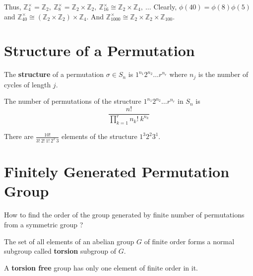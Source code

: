 \begin{enumerate}
		Thus, $\mathbb{Z}_4^\times = \mathbb{Z}_2,\ \mathbb{Z}_8^\times = \mathbb{Z}_2 \times \mathbb{Z}_2,\ \mathbb{Z}_{16}^\times \cong \mathbb{Z}_2 \times \mathbb{Z}_4,\ \dots$
		Clearly, $\phi(40) = \phi(8)\phi(5)$ and $\mathbb{Z}_{40}^\times \cong (\mathbb{Z}_2 \times \mathbb{Z}_2) \times \mathbb{Z}_4$.
		And $\mathbb{Z}_{1000}^\times \cong \mathbb{Z}_2 \times \mathbb{Z}_2 \times \mathbb{Z}_{100}$.
\end{enumerate}

\section{Structure of a Permutation}
\begin{definition}
	The \textbf{structure} of a permutation $\sigma \in S_n$ is $1^{n_1} 2^{n_2} \dots r^{n_r}$ where $n_j$ is the number of cycles of length $j$.
\end{definition}
	The number of permutations of the structure $1^{n_1} 2^{n_2} \dots r^{n_r}$ in $S_n$ is
	$$ \frac{n!}{\prod_{k=1}^r n_k!\ k^{n_k}}$$

	There are $\frac{10!}{3!\ 2!\ 1!\ 2^2\ 3}$ elements of the structure $1^3 2^2 3^1$.


\section{Finitely Generated Permutation Group}
How to find the order of the group generated by finite number of permutations from a symmetric group ?
\begin{definition}
	The set of all elements of an abelian group $G$ of finite order forms a normal subgroup called \textbf{torsion} subgroup of $G$.
\end{definition}

\begin{definition}
	A \textbf{torsion free} group has only one element of finite order in it.
\end{definition}

